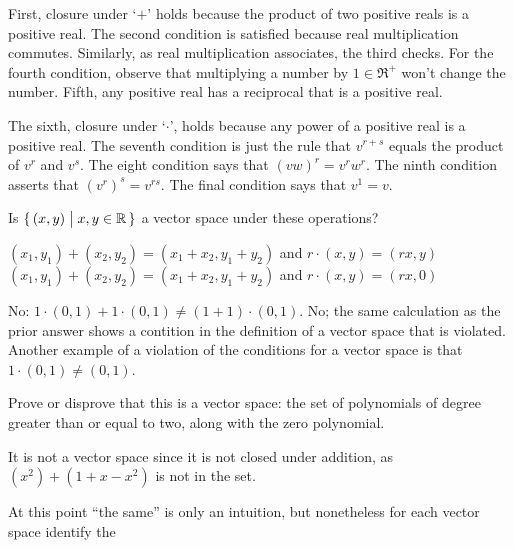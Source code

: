 \begin{exercises}
\begin{answer}
      First, closure under `\( + \)'
      holds because the product of two positive reals is
      a positive real.
      The second condition is satisfied because real multiplication commutes.
      Similarly, as real multiplication associates, the third checks.
      For the fourth condition, observe that multiplying a number by
      \( 1\in\Re^+ \) won't change the number.
      Fifth, any positive real has a reciprocal that is a positive real.

      The sixth, closure under `\( \cdot \)', 
      holds because any power of a positive real is a
      positive real.
      The seventh condition is just the rule that \( v^{r+s} \) equals
      the product of \( v^r \) and \( v^s \).
      The eight condition says that \( (vw)^r=v^rw^r \).
      The ninth condition asserts that \( (v^r)^s=v^{rs} \).
      The final condition says that \( v^1=v \).  
    \end{answer}
  \item 
      Is \( \mbox{$\{\,(x,y)\bigm| x,y\in\mathbb{R}\,\}$} \) a vector space under
      these operations?
      \begin{exparts}
        \partsitem \( (x_1,y_1)+(x_2,y_2)=(x_1+x_2,y_1+y_2) \)
        and \( r\cdot (x,y)=(rx,y) \)
        \partsitem \( (x_1,y_1)+(x_2,y_2)=(x_1+x_2,y_1+y_2) \)
        and \( r\cdot (x,y)=(rx,0) \)
      \end{exparts}
      \begin{answer}
        \begin{exparts}
           \partsitem No: \( 1\cdot(0,1)+1\cdot(0,1)\neq (1+1)\cdot(0,1) \).
           \partsitem No; the same calculation as the prior answer shows
              a contition in the definition of a vector space that is 
              violated. 
              Another example of a violation of the conditions for a 
              vector space is that \( 1\cdot (0,1)\neq (0,1) \). 
        \end{exparts}  
      \end{answer}
  \item 
    Prove or disprove that 
    this is a vector space: the set of polynomials of
    degree greater than or equal to two, along with the zero polynomial.
    \begin{answer}
      It is not a vector space since it is not closed under addition, as
      \( (x^2)+(1+x-x^2) \) is not in the set.  
    \end{answer}
  \item 
    At this point ``the same'' is only an
    intuition, but nonetheless for each vector space identify the

\end{exercises}
